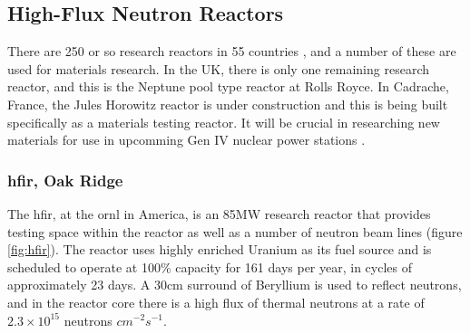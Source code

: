 \FloatBarrier
\subsection{High-Flux Neutron Reactors}

There are 250 or so research reactors in 55 countries \cite{researchreactorstats}, and a number of these are used for materials research.  In the UK, there is only one remaining research reactor, and this is the Neptune pool type reactor at Rolls Royce\cite{neptunereactor}.  In Cadrache, France, the Jules Horowitz reactor is under construction and this is being built specifically as a materials testing reactor.  It will be crucial in researching new materials for use in upcomming Gen IV nuclear power stations \cite{researchreactorstats}.  


\FloatBarrier
\subsubsection{\acrlong{hfir}, Oak Ridge}

The \acrlong{hfir}, at the \acrlong{ornl} in America, is an 85MW research reactor that provides testing space within the reactor as well as a number of neutron beam lines (figure \ref{fig:hfir}).  The reactor uses highly enriched Uranium as its fuel source and is scheduled to operate at 100\% capacity for 161 days per year, in cycles of approximately 23 days.  A 30cm surround of Beryllium is used to reflect neutrons, and in the reactor core there is a high flux of thermal neutrons at a rate of $2.3 \times 10^{15}$ neutrons $cm^{-2} s^{-1}$\cite{hfirornluserguide}.


